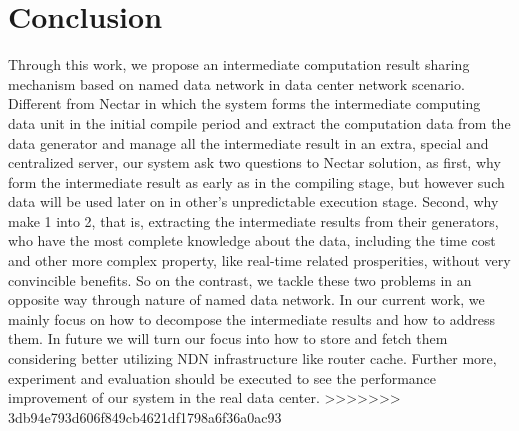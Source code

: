 \section{Conclusion}
Through this work, we propose an intermediate computation result sharing mechanism based on named data network in data center network scenario. Different from Nectar in which the system forms the intermediate computing data unit in the initial compile period and extract the computation data from the data generator and manage all the intermediate result in an extra, special and centralized server, our system ask two questions to Nectar solution, as first, why form the intermediate result as early as in the compiling stage, but however such data will be used later on in other’s unpredictable execution stage. Second, why make 1 into 2, that is, extracting the intermediate results from their generators, who have the most complete knowledge about the data, including the time cost and other more complex property, like real-time related prosperities, without very convincible benefits. So on the contrast, we tackle these two problems in an opposite way through nature of named data network. In our current work, we mainly focus on how to decompose the intermediate results and how to address them. In future we will turn our focus into how to store and fetch them considering better utilizing NDN infrastructure like router cache. Further more, experiment and evaluation should be executed to see the performance improvement of our system in the real data center.
>>>>>>> 3db94e793d606f849cb4621df1798a6f36a0ac93
